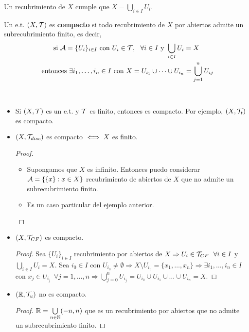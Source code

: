 \begin{observacion}
    Un recubrimiento de $X$ cumple que $X=\bigcup\limits_{i\in I}U_i$.
    \endsquare
\end{observacion}

\begin{definicion}
    Un e.t. $(X, \mathcal{T})$ es \textbf{compacto} si todo recubrimiento de $X$ por abiertos admite un subrecubrimiento finito, es decir,
    \begin{gather*}
        \text{si } \cc{A}=\{U_i\}_{i\in I} \text{ con } U_i\in \cc{T},\ \ \forall i \in I \text{ y } \bigcup\limits_{i\in I} U_i=X\\
        \text{ entonces } \exists i_1,\dots,i_n \in I \text{ con } X=U_{i_1}\cup \dots\cup U_{i_n}=\bigcup\limits_{j=1}^{n}U_{ij}
    \end{gather*}
    \endsquare
\end{definicion}

\begin{ejemplo}\
    \begin{itemize}
        \item Si $(X, \mathcal{T})$ es un e.t. y $\mathcal{T}$ es finito, entonces es compacto. Por ejemplo, $(X, \mathcal{T}_t)$ es compacto.
        \item $(X, \mathcal{T}_{disc})$ es compacto $\iff X$ es finito. 
        \begin{proof}\
            \begin{itemize}
                \item[$\Rightarrow$ )] Supongamos que $X$ es infinito. Entonces puedo considerar $\mathcal{A}=\{\{x\}:x\in X\}$ recubrimiento de abiertos de $X$ que no admite un subrecubrimiento finito.
                \item[$\Leftarrow$ )] Es un caso particular del ejemplo anterior. 
            \end{itemize}
        \end{proof}
        \item $(X, \mathcal{T}_{CF})$ es compacto. 
        \begin{proof}
            Sea $\{U_i\}_{i\in I}$ recubrimiento por abiertos de $X \Rightarrow U_i\in \mathcal{T}_{CF}\ \ \forall i \in I$ y $\bigcup\limits_{i\in I}U_i=X$. Sea $i_0\in I$ con $U_{i_0}\neq \emptyset \Rightarrow X\setminus U_{i_0}=\{x_1, \dots,x_n\} \Rightarrow \exists i_1,\dots,i_n\in I$ con $x_j\in U_{i_j}\ \ \forall j =1,\dots,n \Rightarrow \bigcup\limits_{j=0}^{n} U_{i_j}=U_{i_0}\cup U_{i_1}\cup \dots\cup U_{i_n} = X$. 

        \end{proof}
        \item $(\mathbb{R}, \mathcal{T}_u)$ no es compacto.
        \begin{proof}
            $\mathbb{R}=\bigcup\limits_{n\in \mathbb{N}}(-n,n)$ que es un recubrimiento por abiertos que no admite un subrecubrimiento finito.

        \end{proof}
    \end{itemize}
\end{ejemplo}

